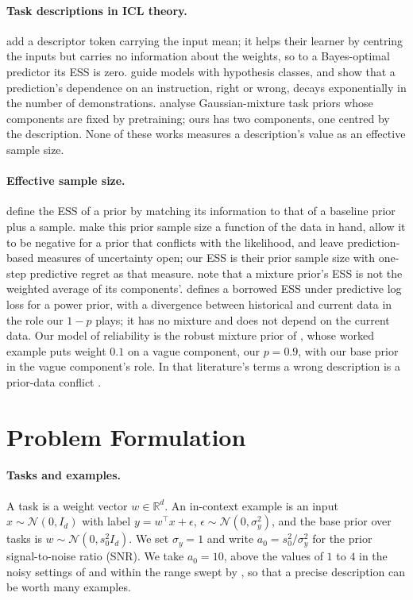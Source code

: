 \documentclass[10pt]{article}
\newcommand{\R}{\mathbb{R}}
\begin{document}
\paragraph{Task descriptions in ICL theory.}
\citet{huangge2025} add a descriptor token carrying the input mean; it helps their learner by centring the inputs but carries no information about the weights, so to a Bayes-optimal predictor its ESS is zero. \citet{lin2025} guide models with hypothesis classes, and \citet{tong2026} show that a prediction's dependence on an instruction, right or wrong, decays exponentially in the number of demonstrations. \citet{lin2024} analyse Gaussian-mixture task priors whose components are fixed by pretraining; ours has two components, one centred by the description. None of these works measures a description's value as an effective sample size.

\paragraph{Effective sample size.}
\citet{morita2008} define the ESS of a prior by matching its information to that of a baseline prior plus a sample. \citet{reimherr2021} make this prior sample size a function of the data in hand, allow it to be negative for a prior that conflicts with the likelihood, and leave prediction-based measures of uncertainty open; our ESS is their prior sample size with one-step predictive regret as that measure. \citet{neuenschwander2020} note that a mixture prior's ESS is not the weighted average of its components'. \citet{reznik2026} defines a borrowed ESS under predictive log loss for a power prior, with a divergence between historical and current data in the role our $1-p$ plays; it has no mixture and does not depend on the current data. Our model of reliability is the robust mixture prior of \citet{schmidli2014}, whose worked example puts weight $0.1$ on a vague component, our $p = 0.9$, with our base prior in the vague component's role. In that literature's terms a wrong description is a prior-data conflict \citep{evans2006}.

\section{Problem Formulation}\label{sec:setting}

\paragraph{Tasks and examples.}
A task is a weight vector $w \in \R^d$. An in-context example is an input $x \sim \mathcal{N}(0, I_d)$ with label $y = w^\top x + \epsilon$, $\epsilon \sim \mathcal{N}(0, \sigma_y^2)$, and the base prior over tasks is $w \sim \mathcal{N}(0, s_0^2 I_d)$. We set $\sigma_y = 1$ and write $a_0 = s_0^2/\sigma_y^2$ for the prior signal-to-noise ratio (SNR). We take $a_0 = 10$, above the values of $1$ to $4$ in the noisy settings of \citet{garg2022, raventos2023, panwar2024} and within the range swept by \citet{akyurek2023}, so that a precise description can be worth many examples.
\end{document}
